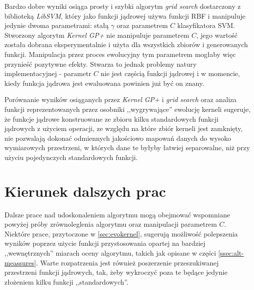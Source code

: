 Bardzo dobre wyniki osiąga prosty i szybki algorytm \emph{grid search} dostarczony z biblioteką \emph{LibSVM}, który jako funkcji jądrowej używa funkcji RBF i manipuluje jedynie dwoma parametrami: stałą $ \gamma $ oraz parametrem $ C $ klasyfikatora SVM. Stworzony algorytm \emph{Kernel GP+} nie manipuluje parametrem $ C $, jego wartość została dobrana eksperymentalnie i użyta dla wszystkich zbiorów i generowanych funkcji. Manipulacja przez proces ewolucyjny tym parametrem mogłaby więc przynieść pozytywne efekty. Stwarza to jednak problemy natury implementacyjnej - parametr $ C $ nie jest częścią funkcji jądrowej i w momencie, kiedy funkcja jądrowa jest ewaluowana powinien już być on znany.

Porównanie wyników osiąganych przez \emph{Kernel GP+} i \emph{grid search} oraz analiza funkcji reprezentowanych przez osobniki ,,wygrywające'' ewolucję kerneli sugeruje, że funkcje jądrowe konstruowane ze zbioru kilku standardowych funkcji jądrowych z użyciem operacji, ze względu na które zbiór kerneli jest zamknięty, nie pozwalają dokonać odmiennych jakościowo mapowań danych do wysoko wymiarowych przestrzeni, w których dane te byłyby łatwiej separowalne, niż przy użyciu pojedynczych standardowych funkcji.

\section{Kierunek dalszych prac}
Dalsze prace nad udoskonaleniem algorytmu mogą obejmować wspomniane powyżej próby zrównoleglenia algorytmu oraz manipulacji parametrem $ C $. Niektóre prace, przytoczone w \ref{sec:evokernel}, sugerują możliwość polepszenia wyników poprzez użycie funkcji przystosowania opartej na bardziej ,,wewnętrznych'' miarach oceny algorytmu, takich jak opisane w części \ref{ssec:alt-meassures}. Warte rozpatrzenia jest również poszerzenie przeszukiwanej przestrzeni funkcji jądrowych, tak, żeby wykroczyć poza te będące jedynie złożeniem kilku funkcji ,,standardowych''.